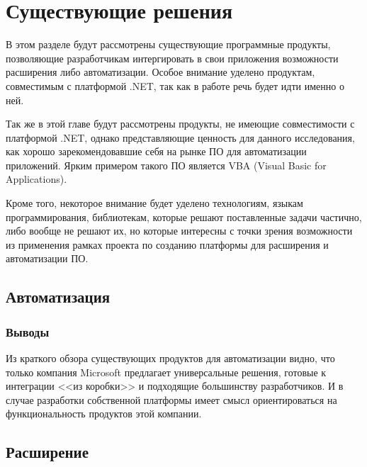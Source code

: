 \section{Существующие решения}

В этом разделе будут рассмотрены существующие программные продукты, позволяющие разработчикам интергировать в свои приложения возможности расширения либо автоматизации. Особое внимание уделено продуктам, совместимым с платформой .NET, так как в работе речь будет идти именно о ней.

Так же в этой главе будут рассмотрены продукты, не имеющие совместимости с платформой .NET, однако представляющие ценность для данного исследования, как хорошо зарекомендовавшие себя на рынке ПО для автоматизации приложений. Ярким примером такого ПО является VBA (Visual Basic for Applications).

Кроме того, некоторое внимание будет уделено технологиям, языкам программирования, библиотекам, которые решают поставленные задачи частично, либо вообще не решают их, но которые интересны с точки зрения возможности из применения рамках проекта по созданию платформы для расширения и автоматизации ПО.

\subsection{Автоматизация}







\subsubsection{Выводы}

Из краткого обзора существующих продуктов для автоматизации видно, что только компания Microsoft предлагает универсальные решения, готовые к интеграции <<из коробки>> и подходящие большинству разработчиков. И в случае разработки собственной платформы имеет смысл ориентироваться на функциональность продуктов этой компании.

\subsection{Расширение}








